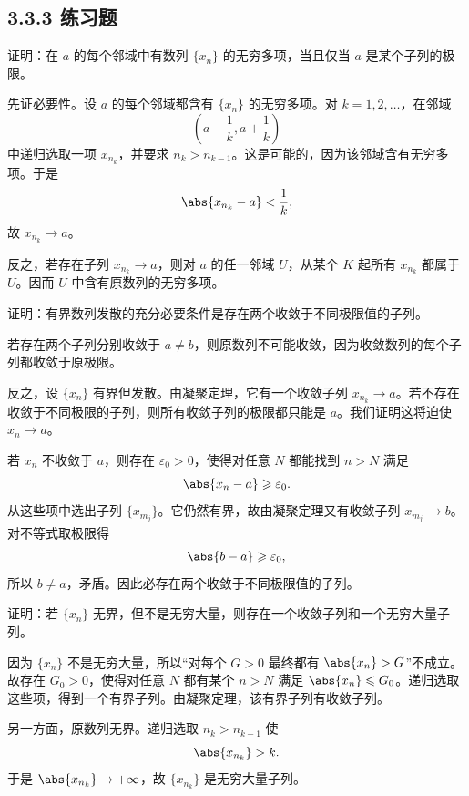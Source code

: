 \subsection*{3.3.3 练习题}

\begin{xexercise}[3.3.3 练习题 1]
证明：在 $a$ 的每个邻域中有数列 $\{x_n\}$ 的无穷多项，当且仅当 $a$ 是某个子列的极限。
\end{xexercise}
\begin{xsolution}
先证必要性。设 $a$ 的每个邻域都含有 $\{x_n\}$ 的无穷多项。对 $k=1,2,\ldots$，在邻域
\[
  \left(a-\frac1k,a+\frac1k\right)
\]
中递归选取一项 $x_{n_k}$，并要求 $n_k>n_{k-1}$。这是可能的，因为该邻域含有无穷多项。于是
\[
  \abs{x_{n_k}-a}<\frac1k,
\]
故 $x_{n_k}\to a$。

反之，若存在子列 $x_{n_k}\to a$，则对 $a$ 的任一邻域 $U$，从某个 $K$ 起所有 $x_{n_k}$ 都属于 $U$。因而 $U$ 中含有原数列的无穷多项。
\end{xsolution}

\begin{xexercise}[3.3.3 练习题 2]
证明：有界数列发散的充分必要条件是存在两个收敛于不同极限值的子列。
\end{xexercise}
\begin{xsolution}
若存在两个子列分别收敛于 $a\neq b$，则原数列不可能收敛，因为收敛数列的每个子列都收敛于原极限。

反之，设 $\{x_n\}$ 有界但发散。由凝聚定理，它有一个收敛子列 $x_{n_k}\to a$。若不存在收敛于不同极限的子列，则所有收敛子列的极限都只能是 $a$。我们证明这将迫使 $x_n\to a$。

若 $x_n$ 不收敛于 $a$，则存在 $\varepsilon_0>0$，使得对任意 $N$ 都能找到 $n>N$ 满足
\[
  \abs{x_n-a}\geqslant\varepsilon_0.
\]
从这些项中选出子列 $\{x_{m_j}\}$。它仍然有界，故由凝聚定理又有收敛子列 $x_{m_{j_l}}\to b$。对不等式取极限得
\[
  \abs{b-a}\geqslant\varepsilon_0,
\]
所以 $b\neq a$，矛盾。因此必存在两个收敛于不同极限值的子列。
\end{xsolution}

\begin{xexercise}[3.3.3 练习题 3]
证明：若 $\{x_n\}$ 无界，但不是无穷大量，则存在一个收敛子列和一个无穷大量子列。
\end{xexercise}
\begin{xsolution}
因为 $\{x_n\}$ 不是无穷大量，所以“对每个 $G>0$ 最终都有 $\abs{x_n}>G$”不成立。故存在 $G_0>0$，使得对任意 $N$ 都有某个 $n>N$ 满足 $\abs{x_n}\leqslant G_0$。递归选取这些项，得到一个有界子列。由凝聚定理，该有界子列有收敛子列。

另一方面，原数列无界。递归选取 $n_k>n_{k-1}$ 使
\[
  \abs{x_{n_k}}>k.
\]
于是 $\abs{x_{n_k}}\to+\infty$，故 $\{x_{n_k}\}$ 是无穷大量子列。
\end{xsolution}

